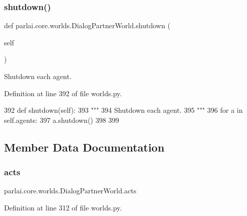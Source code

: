 \subsubsection{\texorpdfstring{shutdown()}{shutdown()}}
{\footnotesize\ttfamily def parlai.\+core.\+worlds.\+Dialog\+Partner\+World.\+shutdown (\begin{DoxyParamCaption}\item[{}]{self }\end{DoxyParamCaption})}

\begin{DoxyVerb}Shutdown each agent.
\end{DoxyVerb}
 

Definition at line 392 of file worlds.\+py.


\begin{DoxyCode}
392     \textcolor{keyword}{def }shutdown(self):
393         \textcolor{stringliteral}{"""}
394 \textcolor{stringliteral}{        Shutdown each agent.}
395 \textcolor{stringliteral}{        """}
396         \textcolor{keywordflow}{for} a \textcolor{keywordflow}{in} self.agents:
397             a.shutdown()
398 
399 
\end{DoxyCode}


\subsection{Member Data Documentation}
\mbox{\label{classparlai_1_1core_1_1worlds_1_1DialogPartnerWorld_ab20044fc960066ca7e04bc4cf580a2be}} 
\subsubsection{\texorpdfstring{acts}{acts}}
{\footnotesize\ttfamily parlai.\+core.\+worlds.\+Dialog\+Partner\+World.\+acts}



Definition at line 312 of file worlds.\+py.

\mbox{\label{classparlai_1_1core_1_1worlds_1_1DialogPartnerWorld_a04185d1d55ca86c96c796f12f2226fc9}} 
